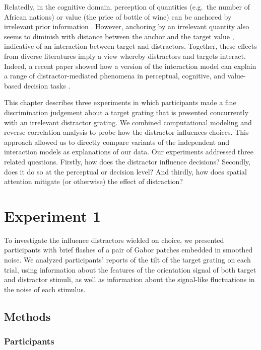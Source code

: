 \documentclass[a4paper, nobind]{templates/ociamthesis}
\begin{document}
Relatedly, in the cognitive domain, perception of quantities (e.g.~the number of African nations) or value (the price of bottle of wine) can be anchored by irrelevant prior information \autocite{ariely2003}. However, anchoring by an irrelevant quantity also seems to diminish with distance between the anchor and the target value \autocite{wegener2001}, indicative of an interaction between target and distractors. Together, these effects from diverse literatures imply a view whereby distractors and targets interact. Indeed, a recent paper showed how a version of the interaction model can explain a range of distractor-mediated phenomena in perceptual, cognitive, and value-based decision tasks \autocite{li2018}.

This chapter describes three experiments in which participants made a fine discrimination judgement about a target grating that is presented concurrently with an irrelevant distractor grating. We combined computational modeling and reverse correlation analysis to probe how the distractor influences choices. This approach allowed us to directly compare variants of the independent and interaction models as explanations of our data. Our experiments addressed three related questions. Firstly, how does the distractor influence decisions? Secondly, does it do so at the perceptual or decision level? And thirdly, how does spatial attention mitigate (or otherwise) the effect of distraction?

\hypertarget{experiment-1}{%
\section{Experiment 1}\label{experiment-1}}

To investigate the influence distractors wielded on choice, we presented participants with brief flashes of a pair of Gabor patches embedded in smoothed noise. We analyzed participants' reports of the tilt of the target grating on each trial, using information about the features of the orientation signal of both target and distractor stimuli, as well as information about the signal-like fluctuations in the noise of each stimulus.

\hypertarget{methods-3}{%
\subsection{Methods}\label{methods-3}}

\hypertarget{participants-1}{%
\subsubsection{Participants}\label{participants-1}}
\end{document}
